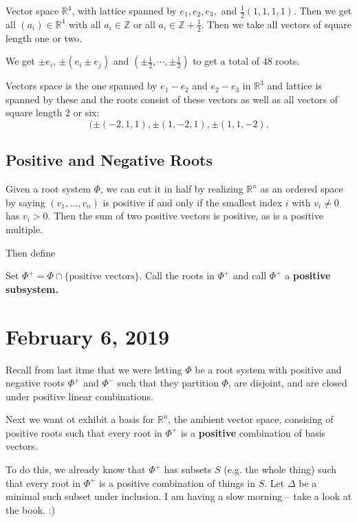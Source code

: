 \documentclass[12pt]{article}
\theoremstyle{nonumberbreak}
\theoremstyle{changebreak}
\theoremstyle{nonumberbreak}
\theoremstyle{change}
\newcommand*{\Z}{
\mathbb{Z}
}
\newcommand*{\R}{
\mathbb{R}
}
\begin{document}
\begin{ex}[$F_4$]
	Vector space $\R^4$, with lattice spanned by $e_1,e_2,e_3,$ and $\frac{1}{2}(1,1,1,1)$.
	Then we get all $(a_i)\in\R^4$ with all $a_i\in\Z$ or all $a_i\in \Z+\frac{1}{2}$. Then we take all vectors of square length one or two.

	We get $\pm e_i$, $\pm(e_i\pm e_j)$ and $(\pm\frac{1}{2},\cdots,\pm\frac{1}{2})$ to get a total of 48 roots.
\end{ex}
\begin{ex}[$G_2=I_2(6)$]
	Vectors space is the one spanned by $e_1-e_2$ and $e_2-e_3$ in $\R^3$ and lattice is spanned by these and the roots 
	consist of these vectors as well as all vectors of square length 2 or six:
	\[(\pm (-2,1,1),\pm (1,-2,1),\pm (1,1,-2).\]
\end{ex}
\subsection{Positive and Negative Roots}
Given a root system $\Phi$, we can cut it in half by realizing $\R^n$ as an ordered space by saying $(v_1,\dots,v_n)$ is positive
if and only if the smallest index $i$ with $v_i\ne 0$ has $v_i>0$. Then the sum of two positive vectors is positive, as is a positive multiple.

Then define
\begin{defn}
	Set $\Phi^+=\Phi\cap\{\text{positive vectors}\}$. Call the roots in $\Phi^+$ and call $\Phi^+$ a \textbf{positive subsystem.}
\end{defn}

\section{February 6, 2019}
Recall from last itme that we were letting $\Phi$ be a root system with positive and negative roots $\Phi^+$ and $\Phi^-$ such that they partition $\Phi$,
are disjoint, and are closed under positive linear combinations.

Next we want ot exhibit a basis for $\R^n$, the ambient vector space, consising of positive roots such that
every root in $\Phi^+$ is a \textbf{positive} combination of basis vectors.

To do this, we already know that $\Phi^+$ has subsets $S$ (e.g. the whole thing) such that every root in $\Phi^+$ is a positive combination of things in $S$.
Let $\Delta$ be a minimal such subset under inclusion. I am having a slow morning -- take a look at the book. :)
\end{document}
